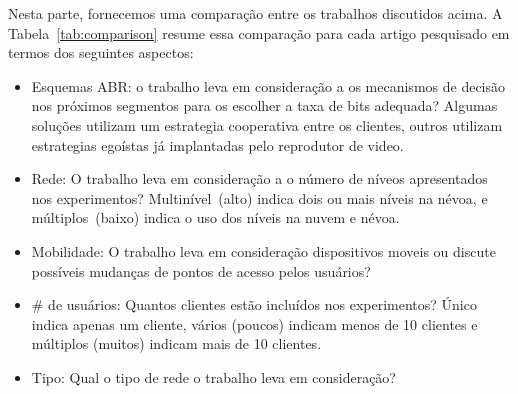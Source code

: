 
Nesta parte, fornecemos uma comparação entre os trabalhos discutidos acima.
A Tabela~\ref{tab:comparison} resume essa comparação para cada artigo pesquisado em termos dos seguintes aspectos:

\begin{itemize}

\item Esquemas ABR: o trabalho leva em consideração a os mecanismos de decisão nos próximos segmentos para os escolher a taxa de bits adequada? Algumas soluções utilizam um estrategia cooperativa entre os clientes, outros utilizam estrategias egoístas já implantadas pelo reprodutor de video.

\item Rede: O trabalho leva em consideração a o número de níveos apresentados nos experimentos? Multinível~(alto) indica dois ou mais níveis na névoa, e múltiplos~(baixo) indica o uso dos níveis na nuvem e névoa.

\item Mobilidade: O trabalho leva em consideração dispositivos moveis ou discute possíveis mudanças de pontos de acesso pelos usuários?

\item \# de usuários: Quantos clientes estão incluídos nos experimentos? Único indica apenas um cliente, vários (poucos) indicam menos de 10 clientes e múltiplos (muitos) indicam mais de 10 clientes.

\item Tipo: Qual o tipo de rede o trabalho leva em consideração?

\end{itemize}

